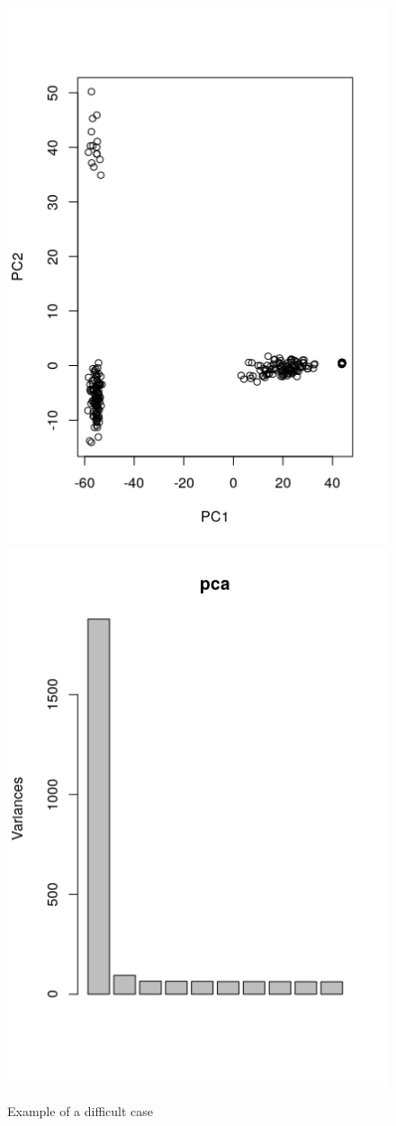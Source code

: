 \documentclass[a4paper, 11pt]{article}
\begin{document}
\begin{figure}[h!]
\caption{Example of a difficult case}
\centering
\includegraphics[scale=0.6]{Rplot_hard_example}
\includegraphics[scale=0.6]{hard_example_eigenvalues}

\end{figure}
\end{document}
